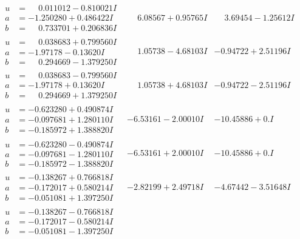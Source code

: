 \documentclass[1p]{elsarticle_modified}
\theoremstyle{definition}
\begin{document}
$$\begin{array}{c|c|c}
\begin{aligned}
u &= \phantom{-}0.011012 - 0.810021 I \\
a &= -1.250280 + 0.486422 I \\
b &= \phantom{-}0.733701 + 0.206836 I\end{aligned}
 & \phantom{-}6.08567 + 0.95765 I & \phantom{-}3.69454 - 1.25612 I \\ \hline\begin{aligned}
u &= \phantom{-}0.038683 + 0.799560 I \\
a &= -1.97178 - 0.13620 I \\
b &= \phantom{-}0.294669 - 1.379250 I\end{aligned}
 & \phantom{-}1.05738 - 4.68103 I & -0.94722 + 2.51196 I \\ \hline\begin{aligned}
u &= \phantom{-}0.038683 - 0.799560 I \\
a &= -1.97178 + 0.13620 I \\
b &= \phantom{-}0.294669 + 1.379250 I\end{aligned}
 & \phantom{-}1.05738 + 4.68103 I & -0.94722 - 2.51196 I \\ \hline\begin{aligned}
u &= -0.623280 + 0.490874 I \\
a &= -0.097681 + 1.280110 I \\
b &= -0.185972 + 1.388820 I\end{aligned}
 & -6.53161 - 2.00010 I & -10.45886 + 0. I\phantom{ +0.000000I} \\ \hline\begin{aligned}
u &= -0.623280 - 0.490874 I \\
a &= -0.097681 - 1.280110 I \\
b &= -0.185972 - 1.388820 I\end{aligned}
 & -6.53161 + 2.00010 I & -10.45886 + 0. I\phantom{ +0.000000I} \\ \hline\begin{aligned}
u &= -0.138267 + 0.766818 I \\
a &= -0.172017 + 0.580214 I \\
b &= -0.051081 + 1.397250 I\end{aligned}
 & -2.82199 + 2.49718 I & -4.67442 - 3.51648 I \\ \hline\begin{aligned}
u &= -0.138267 - 0.766818 I \\
a &= -0.172017 - 0.580214 I \\
b &= -0.051081 - 1.397250 I\end{aligned}

\end{array}$$
\end{document}

